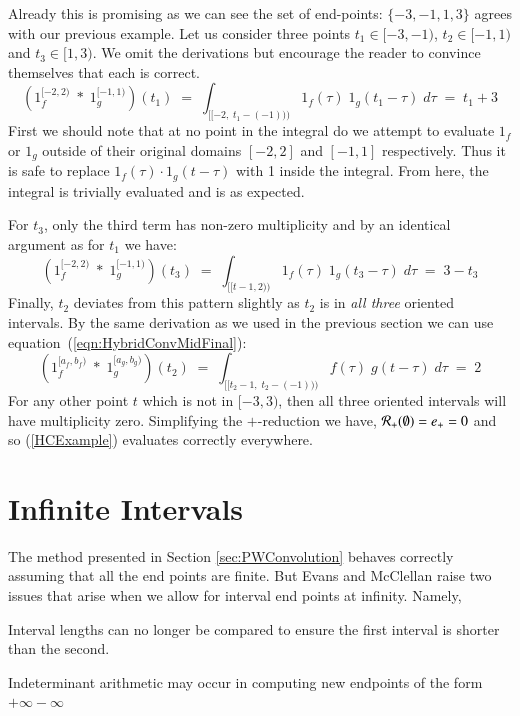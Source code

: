 Already this is promising as we can see the set of end-points: $\{-3, -1, 1, 3\}$ agrees with our previous example.
Let us consider three points $t_1 \in [-3, -1)$, $t_2 \in [-1, 1)$ and $t_3 \in [1,3)$.
We omit the derivations but encourage the reader to convince themselves that each is correct.
\begin{equation*}
	(1_f^{[-2,2)} \;*\; 1_g^{[-1,1)}) (t_1) 
		\;=\; \int_{[\![-2,\;t_1-(-1))\!)} 1_f(\tau) \; 1_g(t_1-\tau) \; d\tau
		\;=\; t_1 + 3
\end{equation*}
First we should note that at no point in the integral do we attempt to evaluate $1_f$ or $1_g$ outside of their original 
domains $[-2,2]$ and $[-1,1]$ respectively. 
Thus it is safe to replace $1_f(\tau)\cdot 1_g(t-\tau)$ with 1  inside the integral.
From here, the integral is trivially evaluated and is as expected.


For $t_3$, only the third term has non-zero multiplicity and by an identical argument as for $t_1$ we have:
\begin{equation*}
	(1_f^{[-2,2)} \;*\; 1_g^{[-1,1)}) (t_3) 
		\;=\; \int_{[\![t-1,2)\!)} 1_f(\tau) \; 1_g(t_3-\tau) \; d\tau
		\;=\; 3 - t_3
\end{equation*}
Finally, $t_2$ deviates from this pattern slightly as $t_2$ is in \emph{all three} oriented intervals.
By the same derivation as we used in the previous section we can use equation~(\ref{eqn:HybridConvMidFinal}):
\begin{equation*}
	\label{eqn:HCExampleT2}
	(1_f^{[a_f,b_f)} \;*\; 1_g^{[a_g,b_g)}) (t_2) 
		\;=\; \int_{[\![t_2-1,\;t_2-(-1))\!)} f(\tau) \; g(t-\tau) \; d\tau
		\;=\; 2
\end{equation*}
For any other point $t$ which is not in $[-3, 3)$, then all three oriented intervals will have multiplicity zero.
Simplifying the $+$-reduction we have, $\R[+](\emptyset) = e_+ = 0$ and so (\ref{HCExample}) evaluates correctly 
everywhere.




%
%
\section{Infinite Intervals}\label{sec:ConvInfty}


The method presented in Section \ref{sec:PWConvolution} behaves correctly assuming that all the end points are finite.
But Evans and McClellan \cite{evans1994algorithms} raise two issues that arise when we allow for interval end points at
infinity. Namely,
\begin{enumerate*}
	\item Interval lengths can no longer be compared to ensure the first interval is shorter than the second.
	\item Indeterminant arithmetic may occur in computing new endpoints of the form $+\infty-\infty$
\end{enumerate*}


